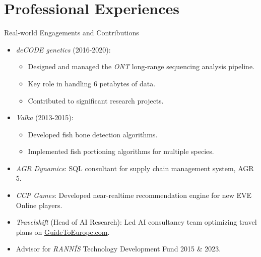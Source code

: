 \documentclass[
    NAME={Dr. Helga Ingimundardóttir},
    EMAIL={helgaingim@hi.is},
    FACULTY={Industrial Engineering},
    SUBTITLE={From Smart Algorithms in Fish Portioning to Pioneering Pipelines in Long-Range DNA Sequencing and Digital Travel},
    SEMINAR={IVT Faculty Gathering},
    DATE={September 6, 2023}
]{hi-latex/hi-beamer}
\begin{document}
\section{Professional Experiences}
\begin{frame}{Real-world Engagements and Contributions}
\begin{itemize}
    \item \emph{deCODE genetics} (2016-2020):
    \begin{itemize}
        \item Designed and managed the \emph{ONT} long-range sequencing analysis pipeline.
        \item Key role in handling 6 petabytes of data.
        \item Contributed to significant research projects.
    \end{itemize}

    \item \emph{Valka} (2013-2015):
    \begin{itemize}
        \item Developed fish bone detection algorithms.
        \item Implemented fish portioning algorithms for multiple species.
    \end{itemize}

    \item \emph{AGR Dynamics}: SQL consultant for supply chain management system, AGR 5.

    \item \emph{CCP Games}: Developed near-realtime recommendation engine for new EVE Online players.

    \item \emph{Travelshift} (Head of AI Research): Led AI consultancy team optimizing travel plans on \href{https://guidetoeurope.com/best-vacation-packages}{GuideToEurope.com}.

    \item Advisor for \emph{RANNÍS} Technology Development Fund 2015 \& 2023.
\end{itemize}
\end{frame}
\end{document}
